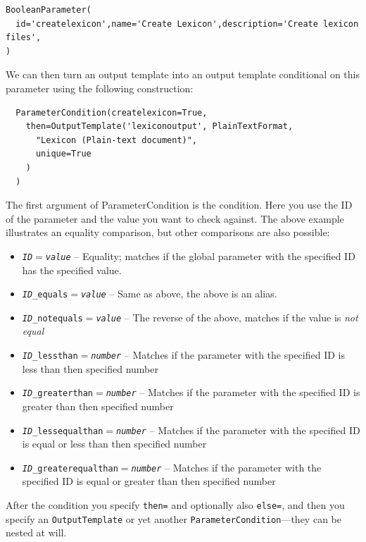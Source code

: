 \documentclass[a4paper,12pt]{report}
\begin{document}
\begin{verbatim}
BooleanParameter(
  id='createlexicon',name='Create Lexicon',description='Create lexicon files', 
)
\end{verbatim}

We can then turn an output template into an output template conditional on this parameter using the following construction:

\begin{verbatim}
  ParameterCondition(createlexicon=True, 
    then=OutputTemplate('lexiconoutput', PlainTextFormat,
      "Lexicon (Plain-text document)",  
      unique=True
    ) 
  )
\end{verbatim}

The first argument of ParameterCondition is the condition. Here you use the ID
of the parameter and the value you want to check against. The above example
illustrates an equality comparison, but other comparisons are also possible:

\begin{itemize}
\item \texttt{\emph{ID}$=$\emph{value}} -- Equality; matches if the global parameter with the specified ID has the specified value.
\item \texttt{\emph{ID}\_equals$=$\emph{value}} -- Same as above, the above is an alias.
\item \texttt{\emph{ID}\_notequals$=$\emph{value}} -- The reverse of the above, matches if the value is \emph{not equal}
\item \texttt{\emph{ID}\_lessthan$=$\emph{number}} -- Matches if the parameter with the specified ID is less than then specified number
\item \texttt{\emph{ID}\_greaterthan$=$\emph{number}} -- Matches if the parameter with the specified ID is greater than then specified number
\item \texttt{\emph{ID}\_lessequalthan$=$\emph{number}} -- Matches if the parameter with the specified ID is equal or less than then specified number
\item \texttt{\emph{ID}\_greaterequalthan$=$\emph{number}} -- Matches if the parameter with the specified ID is equal or greater than then specified number
\end{itemize}

After the condition you specify \texttt{then=} and optionally also
\texttt{else=}, and then you specify an \texttt{OutputTemplate} or yet another
\texttt{ParameterCondition}---they can be nested at will.
\end{document}
